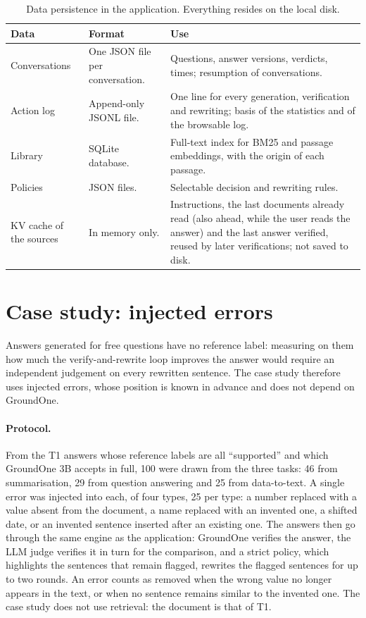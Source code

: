 \begin{table}[htbp]
\centering
\caption{Data persistence in the application. Everything resides on the local disk.}
\label{tab:studio-persistence}
\small
\begin{tabular}{>{\raggedright\arraybackslash}p{3.6cm}>{\raggedright\arraybackslash}p{3.4cm}>{\raggedright\arraybackslash}p{6.0cm}}
\toprule
Data & Format & Use \\
\midrule
Conversations & One JSON file per conversation. & Questions, answer versions, verdicts, times; resumption of conversations. \\ \addlinespace[2pt]
Action log & Append-only JSONL file. & One line for every generation, verification and rewriting; basis of the statistics and of the browsable log. \\ \addlinespace[2pt]
Library & SQLite database. & Full-text index for BM25 and passage embeddings, with the origin of each passage. \\ \addlinespace[2pt]
Policies & JSON files. & Selectable decision and rewriting rules. \\ \addlinespace[2pt]
KV cache of the sources & In memory only. & Instructions, the last documents already read (also ahead, while the user reads the answer) and the last answer verified, reused by later verifications; not saved to disk. \\
\bottomrule
\end{tabular}
\end{table}

\section{Case study: injected errors}
\label{sec:studio-casestudy}

Answers generated for free questions have no reference label: measuring on them how much the verify-and-rewrite loop
improves the answer would require an independent judgement on every rewritten sentence. The case study therefore uses
injected errors, whose position is known in advance and does not depend on GroundOne.

\paragraph{Protocol.} From the T1 answers whose reference labels are all ``supported'' and which GroundOne 3B accepts in
full, 100 were drawn from the three tasks: 46 from summarisation, 29 from question answering and 25 from data-to-text. A
single error was injected into each, of four types, 25 per type: a number replaced with a value absent from the
document, a name replaced with an invented one, a shifted date, or an invented sentence inserted after an existing one.
The answers then go through the same engine as the application: GroundOne verifies the answer, the LLM judge verifies it in
turn for the comparison, and a strict policy, which highlights the sentences that remain flagged, rewrites the flagged sentences for up to two rounds. An error counts as
removed when the wrong value no longer appears in the text, or when no sentence remains similar to the invented one. The
case study does not use retrieval: the document is that of T1.

